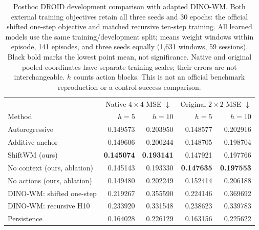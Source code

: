 \begin{table}[!htbp]\centering\small
\setlength{\tabcolsep}{4pt}
\begin{tabular}{@{}lrrrr@{}}\toprule
& \multicolumn{2}{c}{Native $4\!\times\!4$ MSE $\downarrow$}
& \multicolumn{2}{c}{Original $2\!\times\!2$ MSE $\downarrow$} \\
Method & $h=5$ & $h=10$ & $h=5$ & $h=10$ \\ \midrule
Autoregressive & 0.149573 & 0.203950 & 0.148577 & 0.202916 \\
Additive anchor & 0.149606 & 0.200244 & 0.148705 & 0.198704 \\
ShiftWM (ours) & \textbf{0.145074} & \textbf{0.193141} & 0.147921 & 0.197766 \\
No context (ours, ablation) & 0.145143 & 0.193330 & \textbf{0.147635} & \textbf{0.197553} \\
No actions (ours, ablation) & 0.149480 & 0.202249 & 0.152414 & 0.206188 \\
DINO-WM: shifted one-step & 0.219267 & 0.355590 & 0.224146 & 0.369692 \\
DINO-WM: recursive H10 & 0.233920 & 0.331548 & 0.238623 & 0.339783 \\
Persistence & 0.164028 & 0.226129 & 0.163156 & 0.225622 \\
\bottomrule\end{tabular}
\caption{Posthoc DROID development comparison with adapted DINO-WM.
Both external training objectives retain all three seeds and 30 epochs:
the official shifted one-step objective and matched recursive ten-step training.
All learned models use the same training/development split; means weight windows
within episode, 141 episodes, and three seeds equally (1,631 windows, 59 sessions).
Black bold marks the lowest point mean, not significance. Native and original
pooled coordinates have separate training scales; their errors are not interchangeable.
$h$ counts action blocks. This is not an official benchmark reproduction or a
control-success comparison.}
\label{tab:external-dinowm-scores}\end{table}
